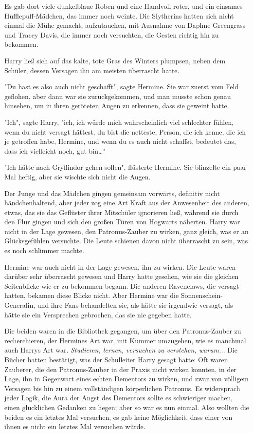 {Es gab dort viele dunkelblaue Roben und eine Handvoll roter, und ein einsames Hufflepuff-Mädchen, das immer noch weinte. Die Slytherins hatten sich nicht einmal die Mühe gemacht, aufzutauchen, mit Ausnahme von Daphne Greengrass und Tracey Davis, die immer noch versuchten, die Gesten richtig hin zu bekommen.

Harry ließ sich auf das kalte, tote Gras des Winters plumpsen, neben dem Schüler, dessen Versagen ihn am meisten überrascht hatte.

"Du hast es also auch nicht geschafft", sagte Hermine. Sie war zuerst vom Feld geflohen, aber dann war sie zurückgekommen, und man musste schon genau hinsehen, um in ihren geröteten Augen zu erkennen, dass sie geweint hatte.

"Ich", sagte Harry, "ich, ich würde mich wahrscheinlich viel schlechter fühlen, wenn du nicht versagt hättest, du bist die netteste, Person, die ich kenne, die ich je getroffen habe, Hermine, und wenn du es auch nicht schaffst, bedeutet das, dass ich vielleicht noch, gut bin…"

"Ich hätte nach Gryffindor gehen sollen", flüsterte Hermine. Sie blinzelte ein paar Mal heftig, aber sie wischte sich nicht die Augen.

Der Junge und das Mädchen gingen gemeinsam vorwärts, definitiv nicht händchenhaltend, aber jeder zog eine Art Kraft aus der Anwesenheit des anderen, etwas, das sie das Geflüster ihrer Mitschüler ignorieren ließ, während sie durch den Flur gingen und sich den großen Türen von Hogwarts näherten. Harry war nicht in der Lage gewesen, den Patronus-Zauber zu wirken, ganz gleich, was er an Glücksgefühlen versuchte. Die Leute schienen davon nicht überrascht zu sein, was es noch schlimmer machte.

Hermine war auch nicht in der Lage gewesen, ihn zu wirken. Die Leute waren darüber sehr überrascht gewesen und Harry hatte gesehen, wie sie die gleichen Seitenblicke wie er zu bekommen begann. Die anderen Ravenclaws, die versagt hatten, bekamen diese Blicke nicht. Aber Hermine war die Sonnenschein-Generalin, und ihre Fans behandelten sie, als hätte sie irgendwie versagt, als hätte sie ein Versprechen gebrochen, das sie nie gegeben hatte.

Die beiden waren in die Bibliothek gegangen, um über den Patronus-Zauber zu recherchieren, der Hermines Art war, mit Kummer umzugehen, wie es manchmal auch Harrys Art war. \emph{Studieren, lernen, versuchen zu verstehen, warum..}. Die Bücher hatten bestätigt, was der Schulleiter Harry gesagt hatte: Oft waren Zauberer, die den Patronus-Zauber in der Praxis nicht wirken konnten, in der Lage, ihn in Gegenwart eines echten Dementors zu wirken, und zwar von völligem Versagen bis hin zu einem vollständigen körperlichen Patronus. Es widersprach jeder Logik, die Aura der Angst des Dementors sollte es schwieriger machen, einen glücklichen Gedanken zu hegen; aber so war es nun einmal. Also wollten die beiden es ein letztes Mal versuchen, es gab keine Möglichkeit, dass einer von ihnen es nicht ein letztes Mal versuchen würde.

}
